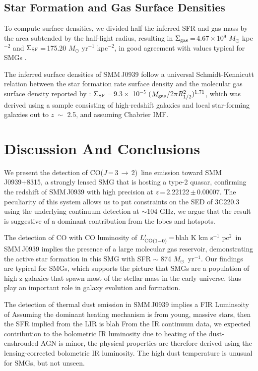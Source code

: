 \documentclass[twocolumn,apj,numberedappendix]{emulateapj}
\newcommand{\Msun}{\mbox{$M_{\odot}$}}
\newcommand{\CO}{\mbox{CO($J$\,=\,3\,$\rightarrow$\,2) }}
\newcommand{\Lp}{\mbox{$L^{\prime}_{\rm CO(1-0)}$}}
\newcommand{\LpU}{\mbox{K\,\,km\,\,s$^{-1}$\,\,pc$^2$}}
\newcommand{\pmOne}{\mbox{$^{-1}$}}
\begin{document}
\subsection{Star Formation and Gas Surface Densities}
To compute surface densities, we divided half the inferred SFR and gas mass by the area subtended by the half-light 
radius, resulting in $\Sigma_{\rm gas}$\,=\,4.67\,$\times$\,10$^9$\,\,\Msun\,\,kpc$^{-2}$ and $\Sigma_{\rm SF}$\,=\,175.20\,\,\Msun\,\,yr\pmOne\,\,kpc$^{-2}$, in good agreement with values typical for SMGs \citep{Tacconi08a}. 

The inferred surface densities of SMM\,J0939 follow a universal Schmidt-Kennicutt relation between the star formation rate
surface density and the molecular gas surface density reported by \citet{B07a}: $\Sigma_{\rm SF}$\,=\,9.3\,$\times$\,
10$^{-5}$ ($M_{\rm gas}$/2$\pi R_{\rm 1/2}^2)^{1.71}$, which was derived using a sample consisting of high-redshift 
galaxies
 and local star-forming galaxies out to $z\ \sim$ 2.5, and assuming Chabrier IMF. 

\section{Discussion And Conclusions} \label{sec:conclusions}
We present the detection of \CO line emission toward SMM\,J0939+8315, a strongly lensed SMG that is hosting a type-2 quasar, confirming the redshift of SMM\,J0939 with high precision at $z$\,=\,2.22122\,$\pm$\,0.00007. The peculiarity of this system allows us to put constraints on the SED of 3C220.3 using the underlying continuum detection at $\sim$104 GHz, we argue that the result is suggestive of a dominant contribution from the lobes and hotspots. 

The detection of CO with CO luminosity of \Lp\,=\,blah \LpU\ in SMM\,J0939 implies the presence of a large molecular gas reservoir, demonstrating the active star formation in 
this SMG with SFR $\sim$ 874 \Msun\ yr\pmOne. Our findings are typical for SMGs, which supports the picture that SMGs are a 
population of high-z galaxies that spawn most of the stellar mass in the early universe, thus play an important role 
in galaxy evolution and formation. 


The detection of thermal dust emission in SMM\,J0939 implies a FIR Luminsoity of 
Assuming the dominant heating mechanism is from young, massive stars, then the SFR implied from the LIR is blah
From the IR continuum data, we expected contribution to the bolometric IR luminosity due to heating of the dust-enshrouded AGN is minor, the physical properties are therefore derived using the lensing-corrected bolometric IR luminosity. The high dust temperature is unusual for SMGs, but not unseen. 
\end{document}
